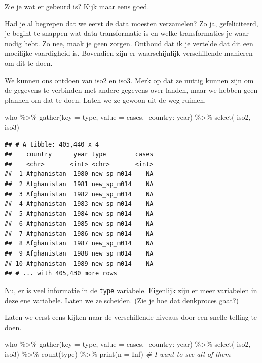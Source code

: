 \documentclass[]{tufte-book}
\newenvironment{Shaded}{}{}
\newcommand{\AttributeTok}[1]{\textcolor[rgb]{0.49,0.56,0.16}{#1}}
\newcommand{\CommentTok}[1]{\textcolor[rgb]{0.38,0.63,0.69}{\textit{#1}}}
\newcommand{\ConstantTok}[1]{\textcolor[rgb]{0.53,0.00,0.00}{#1}}
\newcommand{\FunctionTok}[1]{\textcolor[rgb]{0.02,0.16,0.49}{#1}}
\newcommand{\NormalTok}[1]{#1}
\newcommand{\SpecialCharTok}[1]{\textcolor[rgb]{0.25,0.44,0.63}{#1}}
\begin{document}
Zie je wat er gebeurd is? Kijk maar eens goed.

Had je al begrepen dat we eerst de data moesten verzamelen? Zo ja, gefeliciteerd, je begint te snappen wat data-transformatie is en welke transformaties je waar nodig hebt. Zo nee, maak je geen zorgen. Onthoud dat ik je vertelde dat dit een moeilijke vaardigheid is. Bovendien zijn er waarschijnlijk verschillende manieren om dit te doen.

We kunnen ons ontdoen van iso2 en iso3. Merk op dat ze nuttig kunnen zijn om de gegevens te verbinden met andere gegevens over landen, maar we hebben geen plannen om dat te doen. Laten we ze gewoon uit de weg ruimen.

\begin{Shaded}
\begin{Highlighting}[]
\NormalTok{who }\SpecialCharTok{\%\textgreater{}\%}
  \FunctionTok{gather}\NormalTok{(}\AttributeTok{key =}\NormalTok{ type, }\AttributeTok{value =}\NormalTok{ cases, }\SpecialCharTok{{-}}\NormalTok{country}\SpecialCharTok{:{-}}\NormalTok{year) }\SpecialCharTok{\%\textgreater{}\%}
  \FunctionTok{select}\NormalTok{(}\SpecialCharTok{{-}}\NormalTok{iso2, }\SpecialCharTok{{-}}\NormalTok{iso3)}
\end{Highlighting}
\end{Shaded}

\begin{verbatim}
## # A tibble: 405,440 x 4
##    country      year type        cases
##    <chr>       <int> <chr>       <int>
##  1 Afghanistan  1980 new_sp_m014    NA
##  2 Afghanistan  1981 new_sp_m014    NA
##  3 Afghanistan  1982 new_sp_m014    NA
##  4 Afghanistan  1983 new_sp_m014    NA
##  5 Afghanistan  1984 new_sp_m014    NA
##  6 Afghanistan  1985 new_sp_m014    NA
##  7 Afghanistan  1986 new_sp_m014    NA
##  8 Afghanistan  1987 new_sp_m014    NA
##  9 Afghanistan  1988 new_sp_m014    NA
## 10 Afghanistan  1989 new_sp_m014    NA
## # ... with 405,430 more rows
\end{verbatim}

Nu, er is veel informatie in de \texttt{type} variabele. Eigenlijk zijn er meer variabelen in deze ene variabele. Laten we ze scheiden. (Zie je hoe dat denkproces gaat?)

Laten we eerst eens kijken naar de verschillende niveaus door een snelle telling te doen.

\begin{Shaded}
\begin{Highlighting}[]
\NormalTok{who }\SpecialCharTok{\%\textgreater{}\%}
  \FunctionTok{gather}\NormalTok{(}\AttributeTok{key =}\NormalTok{ type, }\AttributeTok{value =}\NormalTok{ cases, }\SpecialCharTok{{-}}\NormalTok{country}\SpecialCharTok{:{-}}\NormalTok{year) }\SpecialCharTok{\%\textgreater{}\%}
  \FunctionTok{select}\NormalTok{(}\SpecialCharTok{{-}}\NormalTok{iso2, }\SpecialCharTok{{-}}\NormalTok{iso3) }\SpecialCharTok{\%\textgreater{}\%}
  \FunctionTok{count}\NormalTok{(type) }\SpecialCharTok{\%\textgreater{}\%}
  \FunctionTok{print}\NormalTok{(}\AttributeTok{n =} \ConstantTok{Inf}\NormalTok{) }\CommentTok{\# I want to see all of them}
\end{Highlighting}
\end{Shaded}
\end{document}
